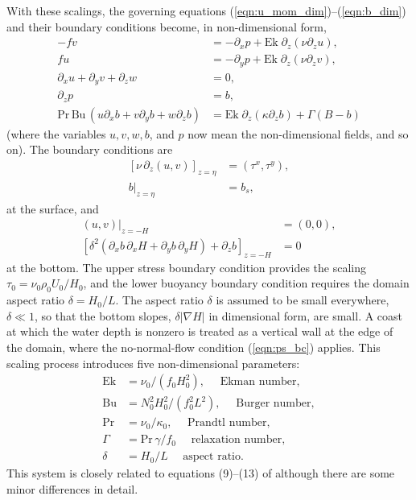 \documentclass{ametsocV6.2}
\begin{document}
With these scalings, the governing equations (\ref{eqn:u_mom_dim})--(\ref{eqn:b_dim}) and their boundary conditions become, in non-dimensional form,
\begin{align}
- f v & = - \partial_x p + \mathrm{Ek} \; \partial_{z} \left( \nu \partial_z u \right), \label{eqn:u_mom} \\
f  u & = - \partial_y p + \mathrm{Ek}  \; \partial_{z} \left( \nu \partial_z v \right) ,  \label{eqn:v_mom} \\
\partial_x u + \partial_y v + \partial_z w & = 0 \label{eqn:non-divergent} , \\
\partial_z p & = b , \label{eqn:hydrostasy} \\
\mathrm{Pr} \,\mathrm{Bu}\, \left( u \partial_x b + v \partial_y b + w \partial_z b \right) & = \mathrm{Ek} \; \partial_{z} \left( \kappa \partial_z b \right) + \Gamma \left( B - b \right)
\label{eqn:b} 
\end{align}
(where the variables $u, v, w, b$, and $p$ now mean the non-dimensional fields, and so on).
The boundary conditions are
\begin{align}
\left[ \nu \, \partial_z (u, v)\right]_{z = \eta} & = (\tau^x , \tau^y ), \label{eqn:top_uv_bc} \\
\left. b \right|_{z = \eta} & = b_s ,
\label{eqn:top_b_bc}
\end{align}
at the surface, and
\begin{align}
\left. (u, v) \right|_{z = -H} & = (0, 0) ,  \label{eqn:bot_uv_bc} \\
\left[ \delta^2 \left(\partial_x b\, \partial_x H + \partial_y b \, \partial_y H \right) + \partial_z b \right] _{z=-H} & = 0
\label{eqn:bot_b_bc}
\end{align}
at the bottom.
The upper stress boundary condition provides the scaling $\tau_0 = \nu_0 \rho_0 U_0 / H_0 $, and the lower buoyancy boundary condition requires the domain aspect ratio $\delta = H_0 / L$.
The aspect ratio $\delta$ is assumed to be small everywhere, $\delta \ll 1$, so that the bottom slopes, $\delta |\nabla H|$ in dimensional form, are small. A coast at which the water depth is nonzero is treated as a vertical wall at the edge of the domain, where the no-normal-flow condition (\ref{eqn:ps_bc}) applies.
This scaling process introduces five non-dimensional parameters:
\begin{align}
\mathrm{Ek} & = \nu_0 / (f_0 H_0^2 ) , \quad \text{ Ekman number}   , \\
\mathrm{Bu} & = N_0^2 H_0^2 / (f_0^2 L^2) , \quad \text{ Burger number}   , \\
\mathrm{Pr} & = \nu_0 / \kappa_0 , \quad \text{ Prandtl number}  , \\
\Gamma & = \mathrm{Pr}\, \gamma / f_0  \quad \text{ relaxation number} , \\
\delta & = H_0 / L  \quad \text{ aspect ratio} .
\end{align}
This system is closely related to equations (9)--(13) of \citet{peterson&callies26} although there are some minor differences in detail.
\end{document}
